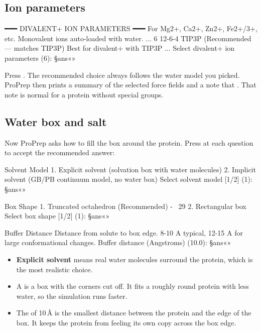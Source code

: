 \subsection{Ion parameters}

\begin{screen}
━━━ DIVALENT+ ION PARAMETERS ━━━
For Mg2+, Ca2+, Zn2+, Fe2+/3+, etc. Monovalent ions auto-loaded with water.
...
  6     12-6-4 TIP3P (Recommended — matches TIP3P)    Best for divalent+ with TIP3P
...
Select divalent+ ion parameters (6): §ans«»
\end{screen}

Press . The recommended choice always follows the water model you
picked. ProPrep then prints a summary of the selected force fields and a note
that . That note is normal for a
protein without special groups.

\subsection{Water box and salt}

Now ProPrep asks how to fill the box around the protein. Press  at
each question to accept the recommended answer:

\begin{screen}
Solvent Model
  1. Explicit solvent (solvation box with water molecules)
  2. Implicit solvent (GB/PB continuum model, no water box)
Select solvent model [1/2] (1): §ans«»

Box Shape
  1. Truncated octahedron (Recommended) - ~29%
  2. Rectangular box
Select box shape [1/2] (1): §ans«»

Buffer Distance
Distance from solute to box edge. 8-10 A typical, 12-15 A for large
conformational changes.
Buffer distance (Angstroms) (10.0): §ans«»
\end{screen}

\begin{itemize}
  \item \textbf{Explicit solvent} means real water molecules surround the
        protein, which is the most realistic choice.
  \item A  is a box with the corners cut off. It
        fits a roughly round protein with less water, so the simulation runs
        faster.
  \item The  of 10\,Å is the smallest distance between the
        protein and the edge of the box. It keeps the protein from feeling its
        own copy across the box edge.
\end{itemize}

